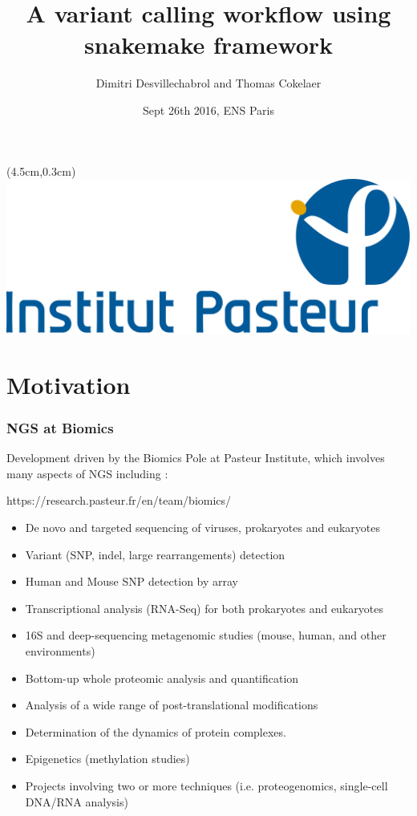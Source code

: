 \documentclass{beamer}
\title{A variant calling workflow using snakemake framework}
\author[D.Desvillechabrol \& T.Cokelaer]{Dimitri Desvillechabrol and Thomas Cokelaer}
\institute{Institut Pasteur}
\date{Sept 26th 2016, ENS Paris}
\begin{document}

\begin{frame}[plain]
    \titlepage
    \begin{textblock*}{5cm}(4.5cm,0.3cm)
        \includegraphics[scale=0.09]{images/Institut_Pasteur.png}
    \end{textblock*}
\end{frame}


\section{Motivation}

\begin{frame}
 \frametitle{NGS at Biomics}
 
 Development driven by the Biomics Pole at Pasteur Institute, which involves
 many aspects of NGS including :
 
 \tiny
 \begin{block}{https://research.pasteur.fr/en/team/biomics/}
  \begin{itemize}
  \item De novo and targeted sequencing of viruses, prokaryotes and eukaryotes
  \item Variant (SNP, indel, large rearrangements) detection
  \item Human and Mouse SNP detection by array
  \item Transcriptional analysis (RNA-Seq) for both prokaryotes and eukaryotes
  \item 16S and deep-sequencing metagenomic studies (mouse, human, and other environments)
  \item Bottom-up whole proteomic analysis and quantification
  \item Analysis of a wide range of post-translational modifications
  \item Determination of the dynamics of protein complexes.
  \item Epigenetics (methylation studies)
  \item Projects involving two or more techniques (i.e. proteogenomics, single-cell DNA/RNA analysis)
  \end{itemize}
 \end{block}
 \small 
\end{frame}
\end{document}
